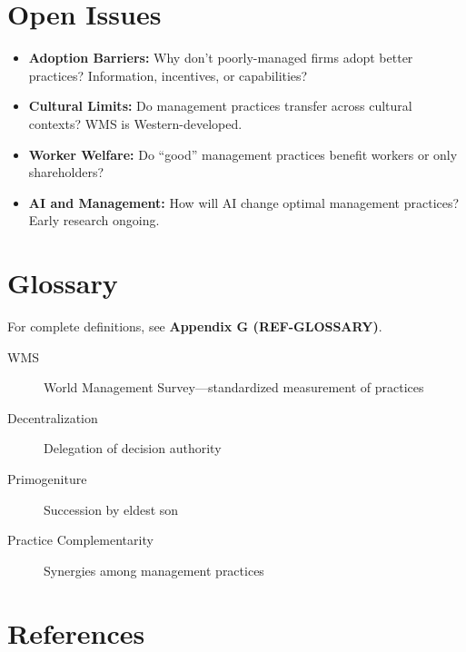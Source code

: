 \section{Open Issues}

\begin{itemize}
    \item \textbf{Adoption Barriers:} Why don't poorly-managed firms adopt
    better practices? Information, incentives, or capabilities?

    \item \textbf{Cultural Limits:} Do management practices transfer across
    cultural contexts? WMS is Western-developed.

    \item \textbf{Worker Welfare:} Do ``good'' management practices benefit
    workers or only shareholders?

    \item \textbf{AI and Management:} How will AI change optimal management
    practices? Early research ongoing.
\end{itemize}

\section{Glossary}

For complete definitions, see \textbf{Appendix G (REF-GLOSSARY)}.

\begin{description}
    \item[WMS] World Management Survey---standardized measurement of practices
    \item[Decentralization] Delegation of decision authority
    \item[Primogeniture] Succession by eldest son
    \item[Practice Complementarity] Synergies among management practices
\end{description}

\section{References}


